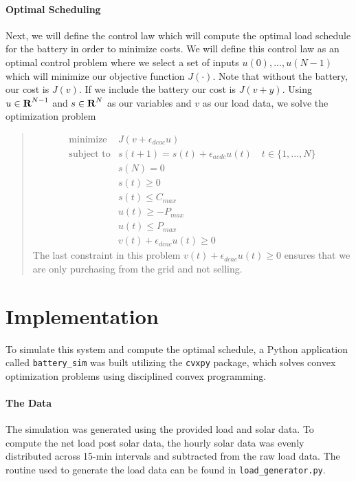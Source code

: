 \documentclass[12pt]{article}
\begin{document}
\paragraph{Optimal Scheduling}
Next, we will define the control law which will compute the optimal load schedule for the battery in order to minimize costs. We will define this control law as an optimal control problem where we select a set of inputs $u(0),...,u(N-1)$ which will minimize our objective function $J(\cdot)$. Note that without the battery, our cost is $J(v)$. If we include the battery our cost is $J(v+y)$. Using $u \in {\mbox{\bf R}}^{N-1} $ and $s \in {\mbox{\bf R}}^{N}$ as our variables and $v$ as our load data, we solve the optimization problem
\begin{quote}
\begin{equation}\label{opteq}
\begin{array}{ll}
\mbox{minimize} & J(v + \epsilon_{dcac} u) \\
\mbox{subject to} & s(t+1) = s(t) + \epsilon_{acdc} u(t) \quad t \in \{1,...,N\} \\
	& s(N) = 0 \\
	& s(t) \geq 0 \\
	& s(t) \leq C_{max} \\
	& u(t) \geq -P_{max} \\\
	& u(t) \leq P_{max} \\
	& v(t) + \epsilon_{dcac} u(t) \geq 0
\end{array}
\end{equation}
The last constraint in this problem $v(t) + \epsilon_{dcac} u(t) \geq 0$ ensures that we are only purchasing from the grid and not selling.
\end{quote}


\section{Implementation}
To simulate this system and compute the optimal schedule, a Python application called \texttt{battery\_sim} was built utilizing the \texttt{cvxpy} package, which solves convex optimization problems using disciplined convex programming.

\paragraph{The Data}
The simulation was generated using the provided load and solar data. To compute the net load post solar data, the hourly solar data was evenly distributed across 15-min intervals and subtracted from the raw load data. The routine used to generate the load data can be found in \texttt{load\_generator.py}.
\end{document}
